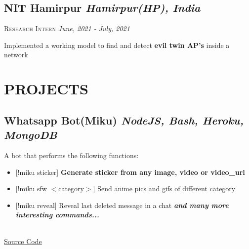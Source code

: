 \documentclass[12pt]{article}
\begin{document}
\subsection*{NIT Hamirpur \hfill \normalsize \normalfont \textit{Hamirpur(HP), India}}
\vspace{-1ex}
\textsc{\textmd{Research Intern}} \hfill \normalsize \textit{June, 2021 - July, 2021}
\vspace{-1ex}

\begin{description}
\setlength{\itemindent}{2\parindent}
\setlength{\itemsep}{0em}
\item[$\bullet$]{Implemented a working model to find and detect \textbf{evil twin AP's} inside a network}
\end{description}


\section{PROJECTS}

\subsection*{Whatsapp Bot(Miku) \hfill \normalsize \textit{NodeJS, Bash, Heroku, MongoDB}}
  \parbox{\textwidth}{ A bot that performs the following functions:   
\setlength{\itemsep}{0em}
  \begin{itemize}
    \item{[!miku sticker] \textbf{Generate sticker from any image, video or video\_url }}
    \item{[!miku sfw $<$category$>$] Send anime pics and gifs of different category}
    \item{[!miku reveal] Reveal last deleted message in a chat}
      \emph{\textbf{and many more interesting commands...}}
  \end{itemize}
  \\ \underline{\href{https://github.com/HARSH-SHETH/miku}{Source Code}}
  }
  \vspace{2mm}
\end{document}
